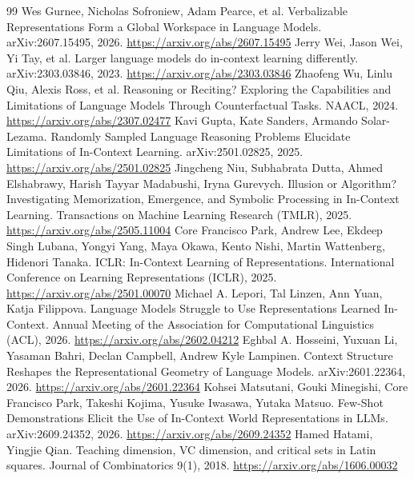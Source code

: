 \documentclass[11pt]{article}
\begin{document}
\begin{thebibliography}{99}
 Wes Gurnee, Nicholas Sofroniew, Adam Pearce, et al. \newblock Verbalizable Representations Form a Global Workspace in Language Models. \newblock arXiv:2607.15495, 2026. \newblock \url{https://arxiv.org/abs/2607.15495}
 Jerry Wei, Jason Wei, Yi Tay, et al. \newblock Larger language models do in-context learning differently. \newblock arXiv:2303.03846, 2023. \newblock \url{https://arxiv.org/abs/2303.03846}
 Zhaofeng Wu, Linlu Qiu, Alexis Ross, et al. \newblock Reasoning or Reciting? Exploring the Capabilities and Limitations of Language Models Through Counterfactual Tasks. \newblock NAACL, 2024. \newblock \url{https://arxiv.org/abs/2307.02477}
 Kavi Gupta, Kate Sanders, Armando Solar-Lezama. \newblock Randomly Sampled Language Reasoning Problems Elucidate Limitations of In-Context Learning. \newblock arXiv:2501.02825, 2025. \newblock \url{https://arxiv.org/abs/2501.02825}
 Jingcheng Niu, Subhabrata Dutta, Ahmed Elshabrawy, Harish Tayyar Madabushi, Iryna Gurevych. \newblock Illusion or Algorithm? Investigating Memorization, Emergence, and Symbolic Processing in In-Context Learning. \newblock Transactions on Machine Learning Research (TMLR), 2025. \newblock \url{https://arxiv.org/abs/2505.11004}
 Core Francisco Park, Andrew Lee, Ekdeep Singh Lubana, Yongyi Yang, Maya Okawa, Kento Nishi, Martin Wattenberg, Hidenori Tanaka. \newblock ICLR: In-Context Learning of Representations. \newblock International Conference on Learning Representations (ICLR), 2025. \newblock \url{https://arxiv.org/abs/2501.00070}
 Michael A. Lepori, Tal Linzen, Ann Yuan, Katja Filippova. \newblock Language Models Struggle to Use Representations Learned In-Context. \newblock Annual Meeting of the Association for Computational Linguistics (ACL), 2026. \newblock \url{https://arxiv.org/abs/2602.04212}
 Eghbal A. Hosseini, Yuxuan Li, Yasaman Bahri, Declan Campbell, Andrew Kyle Lampinen. \newblock Context Structure Reshapes the Representational Geometry of Language Models. \newblock arXiv:2601.22364, 2026. \newblock \url{https://arxiv.org/abs/2601.22364}
 Kohsei Matsutani, Gouki Minegishi, Core Francisco Park, Takeshi Kojima, Yusuke Iwasawa, Yutaka Matsuo. \newblock Few-Shot Demonstrations Elicit the Use of In-Context World Representations in LLMs. \newblock arXiv:2609.24352, 2026. \newblock \url{https://arxiv.org/abs/2609.24352}
 Hamed Hatami, Yingjie Qian. \newblock Teaching dimension, VC dimension, and critical sets in Latin squares. \newblock Journal of Combinatorics 9(1), 2018. \newblock \url{https://arxiv.org/abs/1606.00032}

\end{thebibliography}
\end{document}
